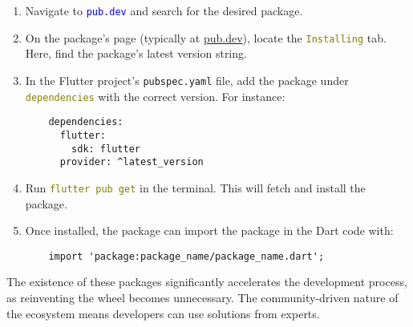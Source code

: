 \documentclass{article}
\begin{document}
\begin{enumerate}
    \item Navigate to \textcolor{blue}{\texttt{pub.dev}} and search for the desired package.
    
		\item On the package's page (typically at \href{https://pub.dev/}{pub.dev}), locate the \textcolor{olive}{\texttt{Installing}} tab. Here, find the package's latest version string.
    
    \item In the Flutter project's \texttt{pubspec.yaml} file, add the package under \textcolor{olive}{\texttt{dependencies}} with the correct version. For instance:
    \begin{verbatim}
    dependencies:
      flutter:
        sdk: flutter
      provider: ^latest_version
		\end{verbatim}
    
    \item Run \textcolor{olive}{\texttt{flutter pub get}} in the terminal. This will fetch and install the package.

    \item Once installed, the package can import the package in the Dart code with:
    \begin{verbatim}
    import 'package:package_name/package_name.dart';
    \end{verbatim}
\end{enumerate}

The existence of these packages significantly accelerates the development process, as reinventing the wheel becomes unnecessary. The community-driven nature of the ecosystem means developers can use solutions from experts.
\end{document}

